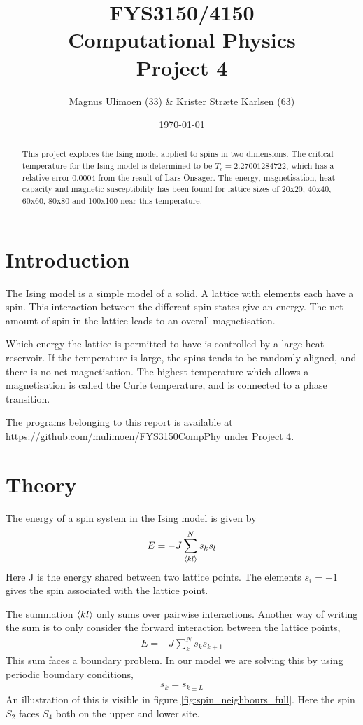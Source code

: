 \documentclass[11pt,a4paper,final]{article}
\title{FYS3150/4150\\Computational Physics\\Project 4}
\author{Magnus Ulimoen (33) \& Krister Stræte Karlsen (63)}
\date{\today}
\numberwithin{equation}{section}
\begin{document}
\maketitle

\begin{abstract}
This project explores the Ising model applied to spins in two dimensions.
The critical temperature for the Ising model is determined to be 
$T_c =  2.27001284722$, which has a relative error $0.0004$ from the result 
of Lars Onsager. The energy, magnetisation, heat-capacity and 
magnetic susceptibility has been found for lattice sizes of 20x20, 40x40,
60x60, 80x80 and 100x100 near this temperature.
\end{abstract}



\section{Introduction}

The Ising model is a simple model of a solid. A lattice with elements 
each have a spin. This interaction between the different spin states
give an energy. The net amount of spin in the 
lattice leads to an overall magnetisation. 

Which energy the lattice 
is permitted to have is controlled by a large heat reservoir. If 
the temperature is large, the spins tends to be randomly aligned, 
and there is no net magnetisation. The highest temperature which 
allows a magnetisation is called the Curie temperature, and is 
connected to a phase transition.

The programs belonging to this report is available at 
\url{https://github.com/mulimoen/FYS3150CompPhy} under Project 4.

\section{Theory}

The energy of a spin system in the Ising model is given by
\begin{gather}
E = -J\sum_{\expval{kl}}^N s_k s_l
\end{gather}
Here J is the energy shared between two lattice points. The elements 
$s_i = \pm 1$ gives the spin associated with 
the lattice point.

The summation $\expval{kl}$ only sums over pairwise interactions.
Another way of writing the sum is to only consider the forward 
interaction between the lattice points,
\begin{gather}
E = -J \sum_{k}^N s_k s_{k+1}
\label{eq:Esum}
\end{gather}
This sum faces a boundary problem. In our model we are solving this 
by using periodic boundary conditions,
\begin{gather}
s_k = s_{k \pm L}
\label{eq:boundary}
\end{gather}
An illustration of this is visible in figure \ref{fig:spin_neighbours_full}.
Here the spin $S_2$ faces $S_4$ both on the upper and lower site.
\end{document}
